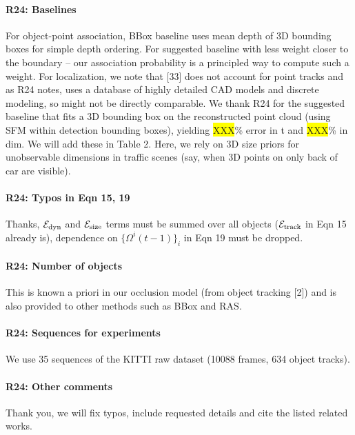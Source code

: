 \documentclass[10pt,twocolumn,letterpaper]{article}
\newcommand{\hili}[1]{\colorbox{yellow}{#1}}
\begin{document}
\paragraph{R24: Baselines}
For object-point association, BBox baseline uses mean depth of 3D bounding boxes for simple depth ordering. For suggested baseline with less weight closer to the boundary -- our association probability is a principled way to compute such a weight. For localization, we note that [33] does not account for point tracks and as R24 notes, uses a database of highly detailed CAD models and discrete modeling, so might not be directly comparable. We thank R24 for the suggested baseline that fits a 3D bounding box on the reconstructed point cloud (using SFM within detection bounding boxes), yielding \hili{XXX}\% error in t and \hili{XXX}\% in dim. We will add these in Table 2.
Here, we rely on 3D size priors for unobservable dimensions in traffic scenes (say, when 3D points on only back of car are visible).


\vspace{-0.4cm}
\paragraph{R24: Typos in Eqn 15, 19}
Thanks, ${\mathcal{E}}_{\textrm{dyn}}$ and ${\mathcal{E}}_{\textrm{size}}$ terms must be summed over all objects (${\mathcal{E}}_{\textrm{track}}$ in Eqn 15 already is), dependence on $\{ \Omega^i (t-1) \}_i$ in Eqn 19 must be dropped.


\vspace{-0.4cm}
\paragraph{R24: Number of objects} 
This is known a priori in our occlusion model (from object tracking [2]) and is also provided to other methods such as BBox and RAS.

\vspace{-0.4cm}
\paragraph{R24: Sequences for experiments} 
We use 35 sequences of the KITTI raw dataset (10088 frames, 634 object tracks).

\vspace{-0.4cm}
\paragraph{R24: Other comments}
Thank you, we will fix typos, include requested details and cite the listed related works.
\end{document}
